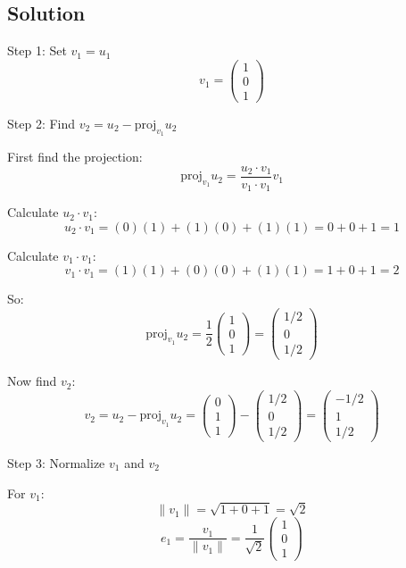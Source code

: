 \subsection*{Solution}

Step 1: Set $v_1 = u_1$
\[
v_1 = \begin{pmatrix} 1 \\ 0 \\ 1 \end{pmatrix}
\]

Step 2: Find $v_2 = u_2 - \text{proj}_{v_1} u_2$

First find the projection:
\[
\text{proj}_{v_1} u_2 = \frac{u_2 \cdot v_1}{v_1 \cdot v_1} v_1
\]

Calculate $u_2 \cdot v_1$:
\[
u_2 \cdot v_1 = (0)(1) + (1)(0) + (1)(1) = 0 + 0 + 1 = 1
\]

Calculate $v_1 \cdot v_1$:
\[
v_1 \cdot v_1 = (1)(1) + (0)(0) + (1)(1) = 1 + 0 + 1 = 2
\]

So:
\[
\text{proj}_{v_1} u_2 = \frac{1}{2} \begin{pmatrix} 1 \\ 0 \\ 1 \end{pmatrix} = \begin{pmatrix} 1/2 \\ 0 \\ 1/2 \end{pmatrix}
\]

Now find $v_2$:
\[
v_2 = u_2 - \text{proj}_{v_1} u_2 = \begin{pmatrix} 0 \\ 1 \\ 1 \end{pmatrix} - \begin{pmatrix} 1/2 \\ 0 \\ 1/2 \end{pmatrix} = \begin{pmatrix} -1/2 \\ 1 \\ 1/2 \end{pmatrix}
\]

Step 3: Normalize $v_1$ and $v_2$

For $v_1$:
\[
\|v_1\| = \sqrt{1 + 0 + 1} = \sqrt{2}
\]
\[
e_1 = \frac{v_1}{\|v_1\|} = \frac{1}{\sqrt{2}} \begin{pmatrix} 1 \\ 0 \\ 1 \end{pmatrix}
\]

